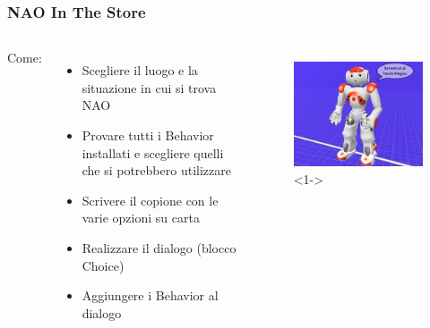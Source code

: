 \documentclass[aspectratio=169]{beamer}
\begin{document}
\begin{frame}
\frametitle{NAO In The Store}
\begin{columns}
		Come:
		\begin{itemize}
			\item<2-> Scegliere il luogo e la situazione in cui si trova NAO
			\item<3-> Provare tutti i Behavior installati e scegliere quelli che si potrebbero utilizzare
			\item<4-> Scrivere il copione con le varie opzioni su carta
			\item<5-> Realizzare il dialogo (blocco Choice)
			\item<6-> Aggiungere i Behavior al dialogo
		\end{itemize}
		\begin{figure}[ht]
		\begin{center}
		\includegraphics[width=.9\textwidth]{paiolo}<1->
		\end{center}
		\end{figure}
\end{columns}
\end{frame}

\ifx\fulldocument\undefined
\end{document}
